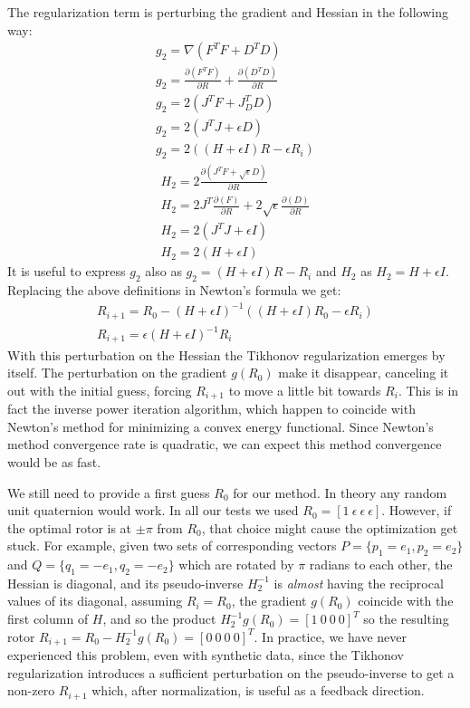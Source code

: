 \documentclass{birkjour}
\numberwithin{equation}{section}
\begin{document}
The regularization term is perturbing the gradient and Hessian in the following way:
\begin{eqnarray*}
g_2 = \nabla(F^T F + D^T D)\\
g_2 = \frac{\partial (F^T F)}{\partial R} + \frac{\partial (D^T D)}{\partial R}\\
g_2 = 2 (J^T F + J_D^T D)\\
g_2 = 2 (J^T J + \epsilon D)\\
g_2 = 2 ((H + \epsilon I) R - \epsilon R_i)
\end{eqnarray*}
\begin{eqnarray*}
H_2 = 2 \frac{\partial(J^T F + \sqrt{\epsilon} D)}{\partial R} \\
H_2 = 2 J^T \frac{\partial(F)}{\partial R} + 2 \sqrt{\epsilon} \frac{\partial(D)}{\partial R}\\
H_2 = 2 (J^T J + \epsilon I)\\
H_2 = 2 (H + \epsilon I)
\end{eqnarray*}
It is useful to express $g_2$ also as $g_2 = (H + \epsilon I) R - R_i$ and $H_2$ as $H_2 = H + \epsilon I$.  
Replacing the above definitions in Newton's formula we get:
\begin{eqnarray*}
R_{i+1} = R_0 - (H + \epsilon I)^{-1} ((H + \epsilon I) R_0 - \epsilon R_i)\\
R_{i+1} = \epsilon (H + \epsilon I)^{-1} R_i
\end{eqnarray*}
With this perturbation on the Hessian the Tikhonov regularization emerges by itself. 
The perturbation on the gradient $g(R_0)$ make it disappear, canceling it out with the initial guess, forcing $R_{i+1}$ to move a little bit towards $R_i$.
This is in fact the inverse power iteration algorithm, which happen to coincide with Newton's method for minimizing a convex energy functional. 
Since Newton's method convergence rate is quadratic, we can expect this method convergence would be as fast.

We still need to provide a first guess $R_0$ for our method. In theory any random unit quaternion would work. In all our tests we used $R_0 = [1 \ \epsilon \ \epsilon \ \epsilon]$.
However, if the optimal rotor is at $\pm \pi$ from $R_0$, that choice might cause the optimization get stuck. For example, given two sets of corresponding vectors $P = \{p_1=e_1, p_2=e_2\}$ and $Q = \{q_1=-e_1, q_2=-e_2\}$ which are rotated by $\pi$ radians to each other, the Hessian is diagonal, and its pseudo-inverse $H_2^{-1}$ is \emph{almost} having the reciprocal values of its diagonal, assuming $R_i = R_0$, the gradient $g(R_0)$ coincide with the first column of $H$, and so the product $H_2^{-1} g(R_0) = [1 \ 0 \ 0 \ 0]^T$ so the resulting rotor $R_{i+1} = R_0 - H_2^{-1} g(R_0) = [0 \ 0 \ 0 \ 0]^T$. In practice, we have never experienced this problem, even with synthetic data, since the Tikhonov regularization introduces a sufficient perturbation on the pseudo-inverse to get a non-zero $R_{i+1}$ which, after normalization, is useful as a feedback direction.
\end{document}
